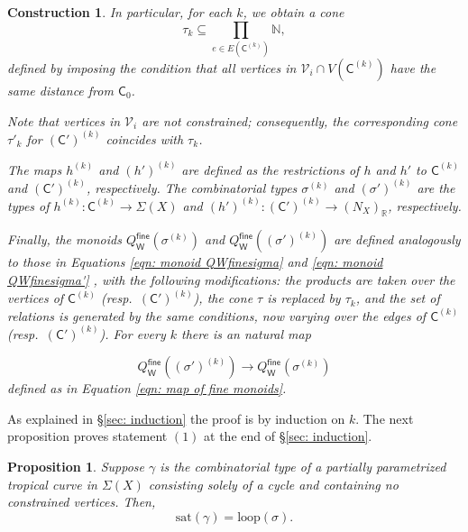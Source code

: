 \documentclass{article}
\newtheorem{proposition}[definition]{Proposition}
\newtheorem{construction}[definition]{Construction}
\newcommand{\tropC}{\mathsf{C}}
\newcommand{\fine}{\mathsf{fine}}
\newcommand{\W}{\mathsf{W}}
\begin{document}
\begin{construction}
In particular, for each $k$, we obtain a cone
\[
\tau_k \subseteq \prod_{e \in E(\tropC^{(k)})} \mathbb{N},
\]
defined by imposing the condition that all vertices in $\mathcal{V}_i \cap V(\tropC^{(k)})$ have the same distance from $\tropC_0$.

Note that vertices in $\mathcal{V}_i$ are not constrained; consequently, the corresponding cone $\tau'_k$ for $(\tropC')^{(k)}$ coincides with $\tau_k$.

The maps $h^{(k)}$ and $(h')^{(k)}$ are defined as the restrictions of $h$ and $h'$ to $\tropC^{(k)}$ and $(\tropC')^{(k)}$, respectively. The combinatorial types $\sigma^{(k)}$ and $(\sigma')^{(k)}$ are the types of $h^{(k)}: \tropC^{(k)} \to \Sigma(X)$ and $(h')^{(k)}: (\tropC')^{(k)} \to (N_X)_\mathbb{R}$, respectively.


Finally, the monoids $Q^\fine_\W(\sigma^{(k)})$ and $Q^\fine_\W((\sigma')^{(k)})$ are defined analogously to those in Equations \eqref{eqn: monoid QWfinesigma} and \eqref{eqn: monoid QWfinesigma'} , with the following modifications: the products are taken over the vertices of $\tropC^{(k)}$ (resp.\ $(\tropC')^{(k)}$), the cone $\tau$ is replaced by $\tau_k$, and the set of relations is generated by the same conditions, now varying over the edges of $\tropC^{(k)}$ (resp.\ $(\tropC')^{(k)}$). For every $k$ there is an natural map

$$
Q^\fine_\W((\sigma')^{(k)}) \to Q^\fine_\W(\sigma^{(k)})
$$
defined as in Equation \eqref{eqn: map of fine monoids}.

\end{construction}

 As explained in \S\ref{sec: induction} the proof is by induction on $k$. The next proposition proves statement $(1)$ at the end of \S\ref{sec: induction}.

\begin{proposition}\label{lem:loop}
Suppose $\gamma$ is the combinatorial type of a partially parametrized tropical curve in $\Sigma(X)$ consisting solely of a cycle and containing no constrained vertices. Then, 
\begin{equation*}
    \mathrm{sat}(\gamma) = \mathrm{loop}(\sigma).
\end{equation*}
\end{proposition}
\end{document}
